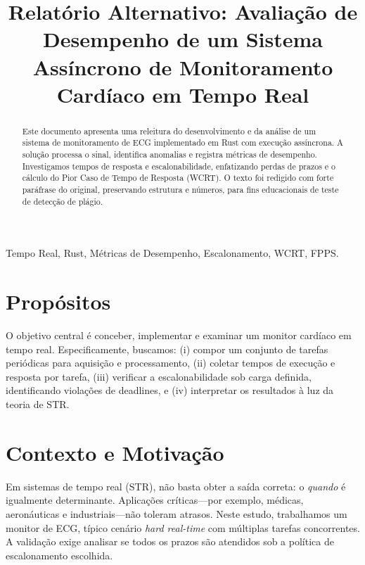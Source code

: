 \documentclass[conference]{IEEEtran}
\begin{document}
\title{Relatório Alternativo: Avaliação de Desempenho de um Sistema Assíncrono de Monitoramento Cardíaco em Tempo Real}

\author{
}

\maketitle

\begin{abstract}
Este documento apresenta uma releitura do desenvolvimento e da análise de um sistema de monitoramento de ECG implementado em Rust com execução assíncrona. A solução processa o sinal, identifica anomalias e registra métricas de desempenho. Investigamos tempos de resposta e escalonabilidade, enfatizando perdas de prazos e o cálculo do Pior Caso de Tempo de Resposta (WCRT). O texto foi redigido com forte paráfrase do original, preservando estrutura e números, para fins educacionais de teste de detecção de plágio.
\end{abstract}

\begin{IEEEkeywords}
Tempo Real, Rust, Métricas de Desempenho, Escalonamento, WCRT, FPPS.
\end{IEEEkeywords}

\section{Propósitos}
O objetivo central é conceber, implementar e examinar um monitor cardíaco em tempo real. Especificamente, buscamos: (i) compor um conjunto de tarefas periódicas para aquisição e processamento, (ii) coletar tempos de execução e resposta por tarefa, (iii) verificar a escalonabilidade sob carga definida, identificando violações de deadlines, e (iv) interpretar os resultados à luz da teoria de STR.

\section{Contexto e Motivação}
Em sistemas de tempo real (STR), não basta obter a saída correta: o \emph{quando} é igualmente determinante. Aplicações críticas---por exemplo, médicas, aeronáuticas e industriais---não toleram atrasos. Neste estudo, trabalhamos um monitor de ECG, típico cenário \emph{hard real-time} com múltiplas tarefas concorrentes. A validação exige analisar se todos os prazos são atendidos sob a política de escalonamento escolhida.
\end{document}
